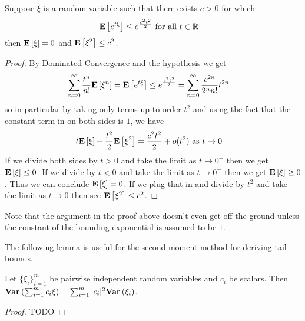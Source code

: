 \begin{lem}Suppose $\xi$ is a random variable such that there exists
  $c>0$ for which
\begin{align*}
\textbf{E}\left[e^{t\xi}\right] &\leq e^{\frac{c^2 t^2}{2}} \text{ for all $t \in \mathbb{R}$}
\end{align*}
then $\textbf{E}\left[\xi\right]=0$ and $\textbf{E}\left[\xi^2\right] \leq c^2$.
\end{lem}
\begin{proof}
By Dominated Convergence and the hypothesis we get
\begin{align*}
\sum_{n=0}^\infty \frac{t^n}{n!}\textbf{E}\left[\xi^n\right] &=
\textbf{E}\left[e^{t\xi}\right] \leq e^{\frac{c^2 t^2}{2}} = \sum_{n=0}^\infty
\frac{c^{2n}}{2^n n!}t^{2n}
\end{align*}
so in particular by taking only terms up to order $t^2$ and using the
fact that the constant term in on both sides is $1$, we have
\begin{align*}
t \textbf{E}\left[\xi\right] + \frac{t^2}{2} \textbf{E}\left[\xi^2\right] &= \frac{c^2 t^2}{2}
+
o(t^2) \text { as $t \to 0$}
\end{align*}
If we divide both sides by $t > 0$ and take the limit as $t \to 0^+$ then we
get $\textbf{E}\left[\xi\right] \leq 0$.  If we divide by $t < 0$ and take the
limit as $t \to 0^-$ then we get $\textbf{E}\left[\xi\right] \geq 0$.  Thus we
can conclude $\textbf{E}\left[\xi\right] = 0$.  If we plug that in and divide
by $t^2$ and take the limit as $t \to 0$ then see $\textbf{E}\left[\xi^2\right]
\leq c^2$.
\end{proof}
Note that the argument in the proof above doesn't even get off the
ground unless the constant of the bounding exponential is assumed to
be $1$.

The following lemma is useful for the second moment method for
deriving tail bounds.
\begin{lem}Let $\{\xi_i\}_{i=1}^m$ be pairwise independent random
  variables and $c_i$ be scalars.  Then $\textbf{Var} \left (\sum_{i=1}^m c_i \xi \right ) =
  \sum_{i=1}^m |c_i|^2\textbf{Var} \left (\xi_i \right )$.
\end{lem}
\begin{proof}
TODO
\end{proof}

